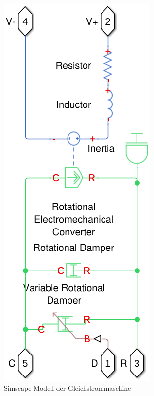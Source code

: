 \begin{figure}
    \centering
    \includegraphics[width=.7\linewidth]{images/model_dc_motor}
    \caption{Simscape Modell der Gleichstrommaschine}
    \label{fig:model_dc_motor}
\end{figure}

